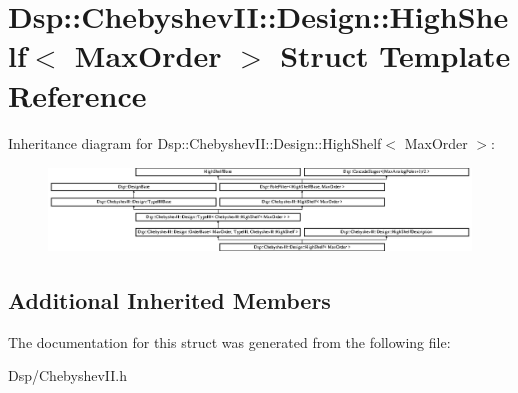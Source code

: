 \hypertarget{structDsp_1_1ChebyshevII_1_1Design_1_1HighShelf}{\section{Dsp\-:\-:Chebyshev\-I\-I\-:\-:Design\-:\-:High\-Shelf$<$ Max\-Order $>$ Struct Template Reference}
\label{structDsp_1_1ChebyshevII_1_1Design_1_1HighShelf}
}
Inheritance diagram for Dsp\-:\-:Chebyshev\-I\-I\-:\-:Design\-:\-:High\-Shelf$<$ Max\-Order $>$\-:\begin{figure}[H]
\begin{center}
\leavevmode
\includegraphics[height=2.244489cm]{structDsp_1_1ChebyshevII_1_1Design_1_1HighShelf}
\end{center}
\end{figure}
\subsection*{Additional Inherited Members}


The documentation for this struct was generated from the following file\-:\begin{DoxyCompactItemize}
\item 
Dsp/Chebyshev\-I\-I.\-h\end{DoxyCompactItemize}
